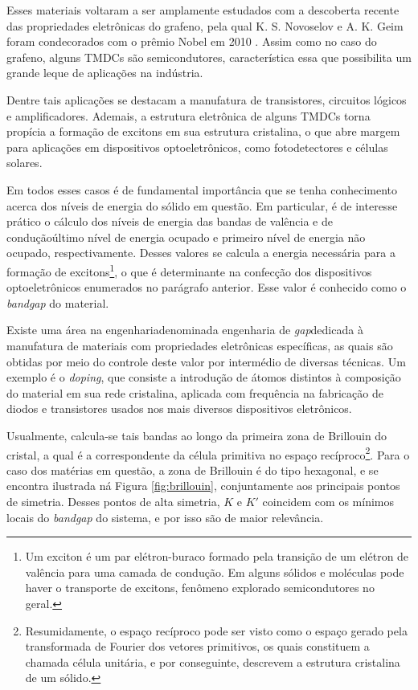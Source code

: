 

Esses materiais voltaram a ser amplamente estudados com a descoberta recente das
propriedades eletrônicas do grafeno, pela qual K. S. Novoselov e A. K. Geim foram
condecorados com o prêmio Nobel em 2010 \cite{kolobov2016tmdc}. Assim como no caso do grafeno, alguns
TMDCs são semicondutores, característica essa que possibilita um grande leque de
aplicações na indústria. 

Dentre tais aplicações se destacam a manufatura de transistores, circuitos
lógicos e amplificadores. Ademais, a estrutura eletrônica de alguns TMDCs torna
propícia a formação de excitons em sua estrutura cristalina, o que abre margem
para aplicações em dispositivos optoeletrônicos, como fotodetectores e células
solares.

Em todos esses casos é de fundamental importância que se tenha conhecimento
acerca dos níveis de energia do sólido em questão. Em particular, é de interesse
prático o cálculo dos níveis de energia das bandas de valência e de
condução\trav último nível de energia ocupado e primeiro nível de energia não
ocupado, respectivamente. Desses valores se calcula a energia necessária para a
formação de excitons\footnote{
  Um exciton é um par elétron-buraco formado pela transição de um elétron de
  valência para uma camada de condução. Em alguns sólidos e moléculas pode haver o
  transporte de excitons, fenômeno explorado semicondutores no geral. 
}, o que é determinante na confecção dos dispositivos optoeletrônicos enumerados
no parágrafo anterior. Esse valor é conhecido como o \textit{bandgap} do material.

Existe uma área na engenharia\trav denominada engenharia de
\textit{gap}\trav dedicada à manufatura de materiais com propriedades
eletrônicas específicas, as quais são obtidas por meio do controle deste valor
por intermédio de diversas técnicas. Um exemplo é o \textit{doping}, que
consiste a introdução de átomos distintos à composição do material em sua rede
cristalina, aplicada com frequência na fabricação de diodos e transistores
usados nos mais diversos dispositivos eletrônicos.

Usualmente, calcula-se tais bandas ao longo da primeira zona de Brillouin do
cristal, a qual é a correspondente da célula primitiva no espaço recíproco\footnote{
  Resumidamente, o espaço recíproco pode ser visto como  o espaço gerado 
  pela transformada de Fourier dos vetores primitivos, os quais constituem
  a chamada célula unitária, e por conseguinte, descrevem a estrutura 
  cristalina de um sólido.
}. Para
o caso dos matérias em questão, a zona de Brillouin é do tipo hexagonal, e se
encontra ilustrada ná Figura \ref{fig:brillouin}, conjuntamente aos principais
pontos de simetria. Desses pontos de alta simetria, $K$ e $K'$ coincidem com os
mínimos locais do \textit{bandgap} do sistema, e por isso são de maior
relevância.

